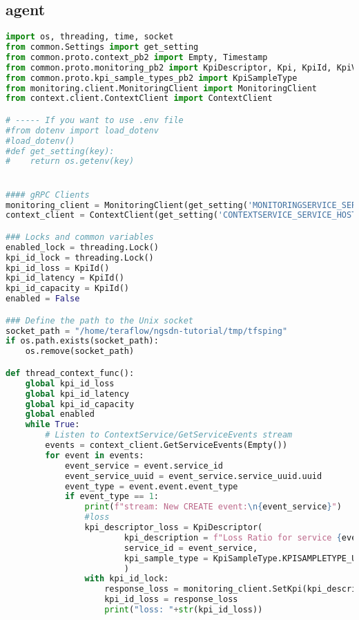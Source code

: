\subsection{agent}
\begin{lstlisting}[language=Python]
import os, threading, time, socket
from common.Settings import get_setting
from common.proto.context_pb2 import Empty, Timestamp
from common.proto.monitoring_pb2 import KpiDescriptor, Kpi, KpiId, KpiValue
from common.proto.kpi_sample_types_pb2 import KpiSampleType
from monitoring.client.MonitoringClient import MonitoringClient
from context.client.ContextClient import ContextClient

# ----- If you want to use .env file
#from dotenv import load_dotenv
#load_dotenv()
#def get_setting(key):
#    return os.getenv(key)


#### gRPC Clients
monitoring_client = MonitoringClient(get_setting('MONITORINGSERVICE_SERVICE_HOST'), get_setting('MONITORINGSERVICE_SERVICE_PORT_GRPC'))
context_client = ContextClient(get_setting('CONTEXTSERVICE_SERVICE_HOST'), get_setting('CONTEXTSERVICE_SERVICE_PORT_GRPC'))

### Locks and common variables
enabled_lock = threading.Lock()
kpi_id_lock = threading.Lock()
kpi_id_loss = KpiId()
kpi_id_latency = KpiId()
kpi_id_capacity = KpiId()
enabled = False

### Define the path to the Unix socket
socket_path = "/home/teraflow/ngsdn-tutorial/tmp/tfsping"
if os.path.exists(socket_path):
    os.remove(socket_path)

def thread_context_func():
    global kpi_id_loss
    global kpi_id_latency
    global kpi_id_capacity
    global enabled
    while True:
        # Listen to ContextService/GetServiceEvents stream 
        events = context_client.GetServiceEvents(Empty())
        for event in events:
            event_service = event.service_id
            event_service_uuid = event_service.service_uuid.uuid
            event_type = event.event.event_type
            if event_type == 1:
                print(f"stream: New CREATE event:\n{event_service}")
                #loss
                kpi_descriptor_loss = KpiDescriptor(
                        kpi_description = f"Loss Ratio for service {event_service_uuid}",
                        service_id = event_service,
                        kpi_sample_type = KpiSampleType.KPISAMPLETYPE_UNKNOWN
                        )
                with kpi_id_lock:
                    response_loss = monitoring_client.SetKpi(kpi_descriptor_loss)
                    kpi_id_loss = response_loss
                    print("loss: "+str(kpi_id_loss))
                    

\end{lstlisting}
